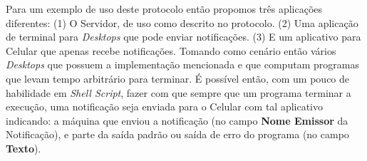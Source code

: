 \documentclass[12pt]{article}
\begin{document}
Para um exemplo de uso deste protocolo então propomos três aplicações diferentes:
(1) O Servidor, de uso como descrito no protocolo.
(2) Uma aplicação de terminal para {\it Desktops} que pode enviar notificações.
(3) E um aplicativo para Celular que apenas recebe notificações.
Tomando como cenário então vários {\it Desktops} que possuem a implementação mencionada
e que computam programas que levam tempo arbitrário para terminar.
É possível então, com um pouco de habilidade em {\it Shell Script},
fazer com que sempre que um programa terminar a execução,
uma notificação seja enviada para o Celular com tal aplicativo indicando:
a máquina que enviou a notificação (no campo {\bf Nome Emissor} da Notificação),
e parte da saída padrão ou saída de erro do programa (no campo {\bf Texto}).
\end{document}
